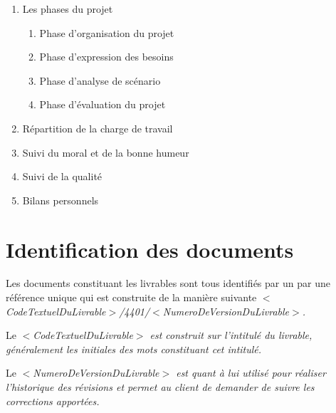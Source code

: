 \begin{enumerate}
    \item Les phases du projet
        \begin{enumerate}
            \item Phase d’organisation du projet
            \item Phase d’expression des besoins
            \item Phase d’analyse de scénario
            \item Phase d’évaluation du projet
        \end{enumerate}
    \item Répartition de la charge de travail
    \item Suivi du moral et de la bonne humeur
    \item Suivi de la qualité
    \item Bilans personnels 
\end{enumerate}

\section{Identification des documents}

Les documents constituant les livrables sont tous identifiés par un par une référence unique qui est construite de la manière suivante \it{$<$CodeTextuelDuLivrable$>$}/4401/\it{$<$NumeroDeVersionDuLivrable$>$}.

Le \it{$<$CodeTextuelDuLivrable$>$} est construit sur l'intitulé du livrable, généralement les initiales des mots constituant cet intitulé. 

Le \it{$<$NumeroDeVersionDuLivrable$>$} est quant à lui utilisé pour réaliser l'historique des révisions et permet au client de demander de suivre les corrections apportées.
